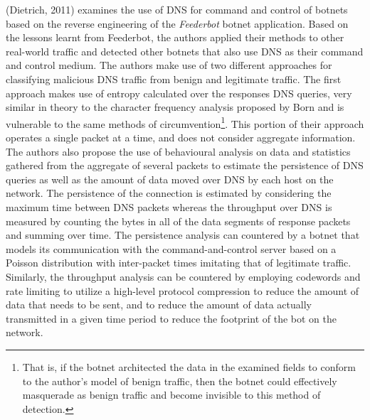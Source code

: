 \documentclass[12pt]{article}
\theoremstyle{remark}
\theoremstyle{definition}
\theoremstyle{definition}
\theoremstyle{definition}
\begin{document}
(Dietrich, 2011)\cite{Dietrich2011} examines the use of DNS for command and
control of botnets based on the reverse engineering of the \emph{Feederbot}
botnet application. Based on the lessons learnt from Feederbot, the authors
applied their methods to other real-world traffic and detected other botnets
that also use DNS as their command and control medium. The authors make use of
two different approaches for classifying malicious DNS traffic from benign and
legitimate traffic. The first approach makes use of entropy calculated over the
responses DNS queries, very similar in theory to the character frequency
analysis proposed by Born\cite{Born2010.cfa} and is vulnerable to the same
methods of circumvention\footnote{That is, if the botnet architected the data in
the examined fields to conform to the author's model of benign traffic, then the
botnet could effectively masquerade as benign traffic and become invisible to
this method of detection.}. This portion of their approach operates a single
packet at a time, and does not consider aggregate information. The authors also
propose the use of behavioural analysis on data and statistics gathered from the
aggregate of several packets to estimate the persistence of DNS queries as well
as the amount of data moved over DNS by each host on the network. The
persistence of the connection is estimated by considering the maximum time
between DNS packets whereas the throughput over DNS is measured by counting the
bytes in all of the data segments of response packets and summing over time. The
persistence analysis can countered by a botnet that models its communication
with the command-and-control server based on a Poisson distribution with
inter-packet times imitating that of legitimate traffic. Similarly, the
throughput analysis can be countered by employing codewords and rate limiting to
utilize a high-level protocol compression to reduce the amount of data that
needs to be sent, and to reduce the amount of data actually transmitted in a
given time period to reduce the footprint of the bot on the network.
\end{document}
